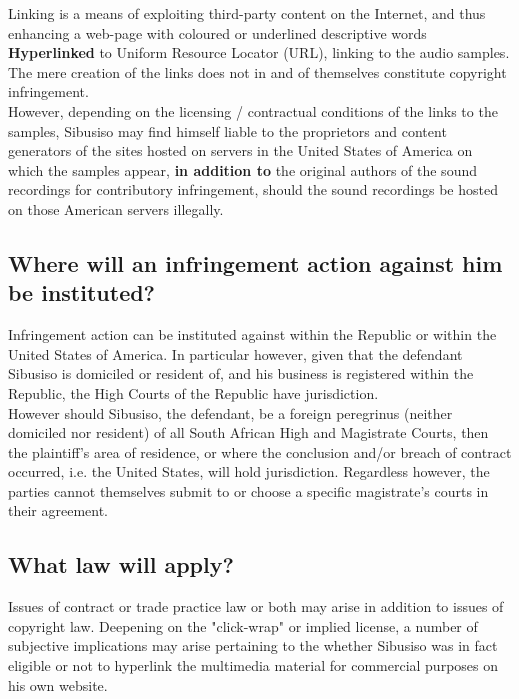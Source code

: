 \documentclass[11pt]{article}
\begin{document}
Linking is a means of exploiting third-party content on the Internet, and thus
enhancing a web-page with coloured or underlined descriptive words \textbf{Hyperlinked}
to Uniform Resource Locator (URL), linking to the audio samples. The mere
creation of the links does not in and of themselves constitute copyright
infringement.\\

However, depending on the licensing / contractual conditions of the links to the
samples, Sibusiso may find himself liable to the proprietors and content
generators of the sites hosted on servers in the United States of America on
which the samples appear, \textbf{in addition to} the original authors of the sound
recordings for contributory infringement, should the sound recordings be hosted
on those American servers illegally.

\subsection{Where will an infringement action against him be instituted?}
\label{sec:orgcc88ded}
Infringement action can be instituted against within the Republic or within the
United States of America. In particular however, given that the defendant
Sibusiso is domiciled or resident of, and his business is registered within the
Republic, the High Courts of the Republic have jurisdiction.\\

However should Sibusiso, the defendant, be a foreign peregrinus (neither
domiciled nor resident) of all South African High and Magistrate Courts, then
the plaintiff's area of residence, or where the conclusion and/or breach of
contract occurred, i.e. the United States, will hold jurisdiction. Regardless
however, the parties cannot themselves submit to or choose a specific
magistrate's courts in their agreement.

\subsection{What law will apply?}
\label{sec:org3447753}
Issues of contract or trade practice law or both may arise in addition to issues
of copyright law. Deepening on the "click-wrap" or implied license, a number of
subjective implications may arise pertaining to the whether Sibusiso was in fact
eligible or not to hyperlink the multimedia material for commercial purposes on
his own website.\\
\end{document}
